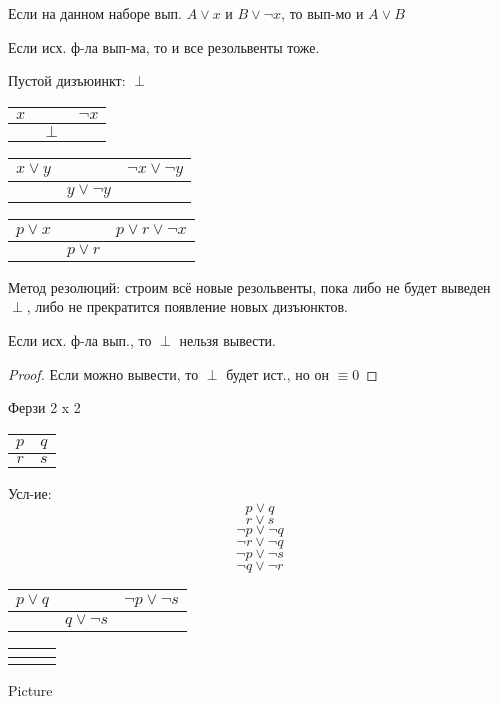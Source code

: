\begin{statement}
Если на данном наборе вып. $A \lor x$ и $B \lor \neg x$, то вып-мо и $A \lor B$
\end{statement}
\begin{consequence}
Если исх. ф-ла вып-ма, то и все резольвенты тоже.
\end{consequence}
Пустой дизъюинкт: $\perp$
\begin{center}
\begin{tabular}{ c c c } 
  $x$ & & $\neg x$ \\ 
 \hline
      & $\perp$ &
\end{tabular}
    
\begin{tabular}{c c c}
  $x \lor y$ & & $\neg x \lor \neg y$ \\
  \hline
             & $y \lor \neg y$ &
\end{tabular}

\begin{tabular}{c c c}
  $p \lor x$ & & $p \lor r \lor \neg x$ \\
  \hline
             & $p \lor r$ & 
\end{tabular}
\end{center}
Метод резолюций: строим всё новые резольвенты, пока либо не будет выведен $\perp$, либо не прекратится появление новых дизъюнктов. \\
\begin{theorem}
Если исх. ф-ла вып., то $\perp$ нельзя вывести.
\end{theorem}
\begin{proof}
Если можно вывести, то $\perp$ будет ист., но он $\equiv 0$
\end{proof}
\begin{example}
Ферзи 2 x 2
\begin{center}
\begin{tabular}{ |c|c| } 
 \hline
 $p$ & $q$ \\ 
 \hline
 $r$ & $s$ \\
 \hline
\end{tabular}
\end{center}
Усл-ие:
\[
p \lor q
\]
\[
r \lor s
\]
\[
\neg p \lor \neg q
\]
\[
\neg r \lor \neg q
\]
\[
\neg p \lor \neg s
\]
\[
\neg q \lor \neg r
\]
\begin{center}
\begin{tabular}{ c c c }
  $ p \lor q $ & & $ \neg p \lor \neg s $ \\
\hline
             & $ q \lor \neg s $ & 
\end{tabular}
\end{center}
\begin{center}
\begin{tabular}{ c c c }
$  $ & & $  $ \\
\hline
& $  $ &
\end{tabular}
\end{center}
Picture
\end{example}
